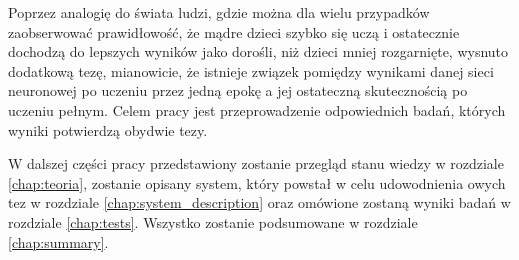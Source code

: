 Poprzez analogię do świata ludzi, gdzie można dla wielu przypadków zaobserwować prawidłowość, że mądre dzieci szybko się uczą i ostatecznie dochodzą do lepszych wyników jako dorośli, niż dzieci mniej rozgarnięte, wysnuto dodatkową tezę, mianowicie, że istnieje związek pomiędzy wynikami danej sieci neuronowej po uczeniu przez jedną epokę a jej ostateczną skutecznością po uczeniu pełnym.
Celem pracy jest przeprowadzenie odpowiednich badań, których wyniki potwierdzą obydwie tezy.

W dalszej części pracy przedstawiony zostanie przegląd stanu wiedzy w rozdziale \ref{chap:teoria}, zostanie opisany system, który powstał w celu udowodnienia owych tez w rozdziale \ref{chap:system_description} oraz omówione zostaną wyniki badań w rozdziale \ref{chap:tests}.
Wszystko zostanie podsumowane w rozdziale \ref{chap:summary}.
